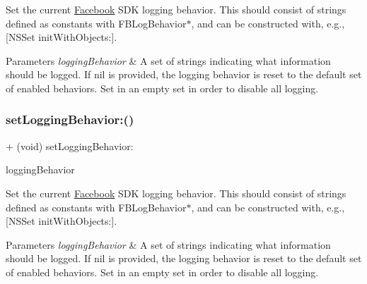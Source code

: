 Set the current \hyperlink{interfaceFacebook}{Facebook} S\+DK logging behavior. This should consist of strings defined as constants with F\+B\+Log\+Behavior$\ast$, and can be constructed with, e.\+g., \mbox{[}N\+S\+Set init\+With\+Objects\+:\mbox{]}.


\begin{DoxyParams}{Parameters}
{\em logging\+Behavior} & A set of strings indicating what information should be logged. If nil is provided, the logging behavior is reset to the default set of enabled behaviors. Set in an empty set in order to disable all logging. \\
\hline
\end{DoxyParams}
\mbox{\label{interfaceFBSettings_aaaf513653d6a8e2d05e0ecea865155c0}} 
\subsubsection{\texorpdfstring{set\+Logging\+Behavior\+:()}{setLoggingBehavior:()}\hspace{0.1cm}{\footnotesize\ttfamily [3/5]}}
{\footnotesize\ttfamily + (void) set\+Logging\+Behavior\+: \begin{DoxyParamCaption}\item[{(N\+S\+Set $\ast$)}]{logging\+Behavior }\end{DoxyParamCaption}}

Set the current \hyperlink{interfaceFacebook}{Facebook} S\+DK logging behavior. This should consist of strings defined as constants with F\+B\+Log\+Behavior$\ast$, and can be constructed with, e.\+g., \mbox{[}N\+S\+Set init\+With\+Objects\+:\mbox{]}.


\begin{DoxyParams}{Parameters}
{\em logging\+Behavior} & A set of strings indicating what information should be logged. If nil is provided, the logging behavior is reset to the default set of enabled behaviors. Set in an empty set in order to disable all logging. \\
\hline
\end{DoxyParams}
\mbox{\label{interfaceFBSettings_aaaf513653d6a8e2d05e0ecea865155c0}} 

